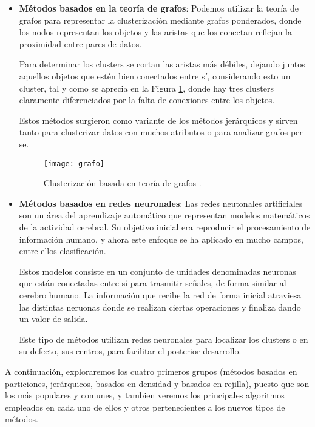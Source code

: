 \documentclass[10pt, a4paper]{article}
\begin{document}
\begin{itemize}
  \item \textbf{Métodos basados en la teoría de grafos}: Podemos utilizar la teoría de grafos \cite{teoria grafos} para representar la clusterización mediante grafos ponderados, donde los nodos representan los objetos y las aristas que los conectan reflejan la proximidad entre pares de datos. 
  
  Para determinar los clusters se cortan las aristas más débiles, dejando juntos aquellos objetos que estén bien conectados entre sí, considerando esto un cluster, tal y como se aprecia en la Figura \ref{fig:grafo}, donde hay tres clusters claramente diferenciados por la falta de conexiones entre los objetos.
  
  Estos métodos surgieron como variante de los métodos jerárquicos y sirven tanto para clusterizar datos con muchos atributos o para analizar grafos per se.
  
  
\begin{figure}[ht]
\centering
\texttt{[image: grafo]}
\caption{Clusterización basada en teoría de grafos \cite{foto grafo}.}
\label{fig:grafo}
\end{figure}
  
  \item \textbf{Métodos basados en redes neuronales}: Las redes neutonales artificiales son un área del aprendizaje automático que representan modelos matemáticos de la actividad cerebral. Su objetivo inicial era reproducir el procesamiento de información humano, y ahora este enfoque se ha aplicado en mucho campos, entre ellos clasificación. 
  
  Estos modelos consiste en un conjunto de unidades denominadas neuronas que están conectadas entre sí para trasmitir señales, de forma similar al cerebro humano. La información que recibe la red de forma inicial atraviesa las distintas neruonas donde se realizan ciertas operaciones y finaliza dando un valor de salida.
  
  Este tipo de métodos utilizan redes neuronales para localizar los clusters o en su defecto, sus centros, para facilitar el posterior desarrollo.
  
\end{itemize}

A continuación, exploraremos los cuatro primeros grupos (métodos basados en particiones, jerárquicos, basados en densidad y basados en rejilla), puesto que son los más populares y comunes, y tambien veremos los principales algoritmos empleados en cada uno de ellos y otros pertenecientes a los nuevos tipos de métodos.
\end{document}
